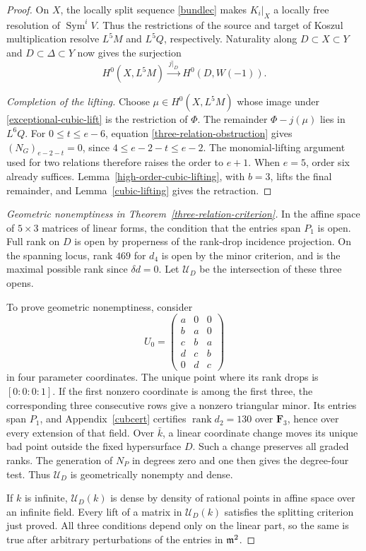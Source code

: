 \begin{proof}
On $X$, the locally split sequence \eqref{bundlec} makes $K_i|_X$
a locally free resolution of $\operatorname{Sym}^iV$.
Thus the restrictions of the source and target of Koszul
multiplication resolve $L^5M$ and $L^5Q$, respectively.
Naturality along $D\subset X\subset Y$ and $D\subset\Delta\subset Y$
now gives the surjection
\begin{equation}\label{exceptional-cubic-lift}
 H^0(X,L^5M)\xrightarrow{\ j|_D\ }H^0(D,W(-1)).
\end{equation}

\emph{Completion of the lifting.}
Choose $\mu\in H^0(X,L^5M)$ whose image under
\eqref{exceptional-cubic-lift} is the restriction of $\Phi$.
The remainder $\Phi-j(\mu)$ lies in $L^6Q$.
For $0\le t\le e-6$, equation \eqref{three-relation-obstruction}
gives $(N_G)_{e-2-t}=0$, since $4\le e-2-t\le e-2$.
The monomial-lifting argument used for two relations therefore
raises the order to $e+1$.
When $e=5$, order six already suffices.
Lemma~\ref{high-order-cubic-lifting}, with $b=3$, lifts the final
remainder, and Lemma~\ref{cubic-lifting} gives the retraction.
\end{proof}

\begin{proof}[Geometric nonemptiness in Theorem~\ref{three-relation-criterion}]
In the affine space of $5\times3$ matrices of linear forms,
the condition that the entries span $P_1$ is open.
Full rank on $D$ is open by properness of the rank-drop incidence projection.
On the spanning locus, rank $469$ for $d_4$ is open by the minor criterion, and is the maximal possible rank since $\delta d=0$.
Let $\mathcal U_D$ be the intersection of these three opens.

To prove geometric nonemptiness, consider
\[
 U_0=\begin{pmatrix}a&0&0\\ b&a&0\\ c&b&a\\ d&c&b\\0&d&c\end{pmatrix}
\]
in four parameter coordinates.
The unique point where its rank drops is $[0:0:0:1]$. If the first nonzero coordinate
is among the first three, the corresponding three consecutive rows
give a nonzero triangular minor.
Its entries span $P_1$, and Appendix~\ref{cubcert} certifies
$\operatorname{rank}d_2=130$ over $\mathbf F_3$, hence over every
extension of that field.
Over $\bar k$, a linear coordinate change moves its unique bad point
outside the fixed hypersurface $D$.
Such a change preserves all graded ranks. The generation of $N_P$ in degrees zero and one then gives the degree-four test.
Thus $\mathcal U_D$ is geometrically nonempty and dense.

If $k$ is infinite, $\mathcal U_D(k)$ is dense by density of rational
points in affine space over an infinite field.
Every lift of a matrix in $\mathcal U_D(k)$ satisfies
the splitting criterion just proved.
All three conditions depend only on the linear part, so the same is
true after arbitrary perturbations of the entries in $\mathfrak m^2$.
\end{proof}

